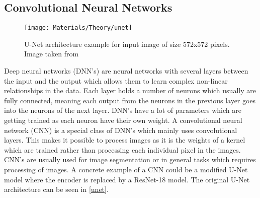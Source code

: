 \subsection{Convolutional Neural Networks}
\begin{wrapfigure}{l}{0.6\linewidth}
	\centering
	\texttt{[image: Materials/Theory/unet]}
	\caption{U-Net architecture example for input image of size 572x572 pixels. Image taken from \cite{unetarticle}}
	\label{unet}
\end{wrapfigure}
Deep neural networks (DNN's) are neural networks with several layers between the input and the output which allows them to learn complex non-linear relationships in the data. Each layer holds a number of neurons which usually are fully connected, meaning each output from the neurons in the previous layer goes into the neurons of the next layer. DNN's have a lot of parameters which are getting trained as each neuron have their own weight. A convolutional neural network (CNN) is a special class of DNN's which mainly uses convolutional layers. This makes it possible to process images as it is the weights of a kernel which are trained rather than processing each individual pixel in the images. CNN's are usually used for image segmentation or in general tasks which requires processing of images. A concrete example of a CNN could be a modified U-Net model where the encoder is replaced by a ResNet-18 model. The original U-Net architecture can be seen in \autoref{unet}.\\
